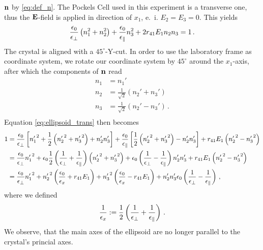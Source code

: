 $\mathbf{n}$ by \eqref{eq:def_n}. 
The Pockels Cell used in this experiment is a transverse one, 
thus the $\mathbf{E}$-field is applied in direction of $x_1$, e.~i. 
$E_2 = E_3 = 0$. This yields
\begin{equation}
    \frac{\epsilon_0}{\epsilon_\perp}\left(n_1^2 + n_2^2\right) + 
    \frac{\epsilon_0}{\epsilon_\parallel} n_3^2 + 
    2 r_{41} E_1 n_2 n_3  = 1 \, .
    \label{eq:ellipsoid_trans}
\end{equation}
The crystal is aligned with a $45^\circ$-Y-cut. In order to 
use the laboratory frame as coordinate system, we rotate our 
coordinate system by $45^\circ$ around the $x_1$-axis, 
after which the components of $\mathbf{n}$ read
\begin{align}
    n_1 &= n_1'  \\
    n_2 &= \frac{1}{\sqrt{2}}\left(n_2' + n_3'\right) \\
    n_3 &= \frac{1}{\sqrt{2}}\left(n_2' - n_3'\right) \, .\\
    \label{eq:trans_ycut}
\end{align}
Equation \eqref{eq:ellipsoid_trans} then becomes
\begin{align}
    1 &= 
    \frac{\epsilon_0}{\epsilon_\perp}
    \left[ {n_1'}^2 + 
    \frac{1}{2} \left({n_2'}^2 + {n_3'}^2 \right) + 
    {n_2'}{n_3'} \right] + 
    \frac{\epsilon_0}{\epsilon_\parallel}
    \left[\frac{1}{2} \left({n_2'}^2 + {n_3'}^2 \right) -  
    {n_2'}{n_3'} \right] + 
    r_{41} E_1 \left({n_2'}^2 - {n_3'}^2\right) 
    \nonumber \\
    &= 
    \frac{\epsilon_0}{\epsilon_\perp}  {n_1'}^2 + 
    \epsilon_0 \frac{1}{2} \left( \frac{1}{\epsilon_\perp} + \frac{1}{\epsilon_\parallel}\right)
    \left({n_2'}^2 + {n_3'}^2 \right) + 
    \epsilon_0 \left( \frac{1}{\epsilon_\perp} - \frac{1}{\epsilon_\parallel}\right)
    {n_2'}{n_3'}  + 
    r_{41} E_1 \left({n_2'}^2 - {n_3'}^2\right) 
    \nonumber \\
    &= 
    \frac{\epsilon_0}{\epsilon_\perp}  {n_1'}^2 + 
    {n_2'}^2 \left(\frac{\epsilon_0}{\epsilon_x} + r_{41} E_1 \right) +
    {n_3'}^2 \left(\frac{\epsilon_0}{\epsilon_x} - r_{41} E_1 \right) +
    {n_2'}{n_3'} \epsilon_0 \left( \frac{1}{\epsilon_\perp} - \frac{1}{\epsilon_\parallel}\right) \, ,
    \label{eq:ell_calc}
\end{align}
where we defined 
\begin{equation}
    \frac{1}{\epsilon_x} := 
    \frac{1}{2} \left( \frac{1}{\epsilon_\perp} + \frac{1}{\epsilon_\parallel}\right) \, .
    \label{eq:def_eps_x}
\end{equation}
We observe, that the main axes of the ellipsoid are no longer parallel to the 
crystal's princial axes.
